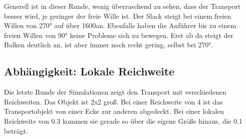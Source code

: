 Generell ist in dieser Runde, wenig überraschend zu sehen, dass der Transport besser wird, je geringer der freie Wille ist. Der Slack steigt bei einem freien Willen von 270° auf über 1600\per an. Ebenfalls haben die Anführer bis zu einem freien Willen von 90° keine Probleme sich zu bewegen. Erst ab da steigt der Balken deutlich an, ist aber immer noch recht gering, selbst bei 270°.

\subsection*{Abhängigkeit: Lokale Reichweite}

Die letzte Runde der Simulationen zeigt den Transport mit verschiedenen Reichweiten. Das Objekt ist 2x2 groß. Bei einer Reichweite von 4 ist das Transportobjekt von einer Ecke zur anderen abgedeckt. Bei einer lokalen Reichweite von 0.3 kommen sie gerade so über die eigene Größe hinaus, die 0.1 beträgt.


